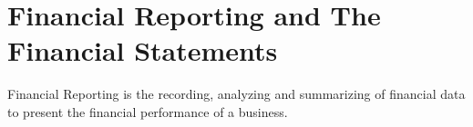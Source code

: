 \section{Financial Reporting and The Financial Statements}

Financial Reporting is the recording, analyzing and summarizing of financial data to present the financial performance of a business.
